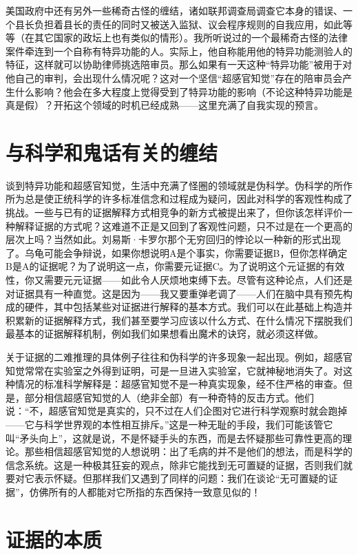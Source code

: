 美国政府中还有另外一些稀奇古怪的缠结，诸如联邦调查局调查它本身的错误、一个县长负担着县长的责任的同时又被送入监狱、议会程序规则的自我应用，如此等等（在其它国家的政坛上也有类似的情形）。我所听说过的一个最稀奇古怪的法律案件牵连到一个自称有特异功能的人。实际上，他自称能用他的特异功能测验人的特征，这样就可以协助律师挑选陪审员。那么如果有一天这种“特异功能”被用于对他自己的审判，会出现什么情况呢？这对一个坚信“超感官知觉”存在的陪审员会产生什么影响？他会在多大程度上觉得受到了特异功能的影响（不论这种特异功能是真是假）？开拓这个领域的时机已经成熟——这里充满了自我实现的预言。

\section{与科学和鬼话有关的缠结}

谈到特异功能和超感官知觉，生活中充满了怪圈的领域就是伪科学。伪科学的所作所为总是使正统科学的许多标准信念和过程成为疑问，因此对科学的客观性构成了挑战。一些与已有的证据解释方式相竞争的新方式被提出来了，但你该怎样评价一种解释证据的方式呢？这难道不正是又回到了客观性问题，只不过是在一个更高的层次上吗？当然如此。刘易斯·卡罗尔那个无穷回归的悖论以一种新的形式出现了。乌龟可能会争辩说，如果你想说明A是个事实，你需要证据B，但你怎样确定B是A的证据呢？为了说明这一点，你需要元证据C。为了说明这个元证据的有效性，你又需要元元证据——如此令人厌烦地束缚下去。尽管有这种论点，人们还是对证据具有一种直觉。这是因为——我又要重弹老调了——人们在脑中具有预先构成的硬件，其中包括某些对证据进行解释的基本方式。我们可以在此基础上构造并积累新的证据解释方式，我们甚至要学习应该以什么方式、在什么情况下摆脱我们最基本的证据解释机制，例如我们如果想看出魔术的诀窍，就必须这样做。

关于证据的二难推理的具体例子往往和伪科学的许多现象一起出现。例如，超感官知觉常常在实验室之外得到证明，可是一旦进入实验室，它就神秘地消失了。对这种情况的标准科学解释是：超感官知觉不是一种真实现象，经不住严格的审查。但是，部分相信超感官知觉的人（绝非全部）有一种奇特的反击方式。他们说：“不，超感官知觉是真实的，只不过在人们企图对它进行科学观察时就会跑掉——它与科学世界观的本性相互排斥。”这是一种无耻的手段，我们可能该管它叫“矛头向上”，这就是说，不是怀疑手头的东西，而是去怀疑那些可靠性更高的理论。那些相信超感官知觉的人想说明：出了毛病的并不是他们的想法，而是科学的信念系统。这是一种极其狂妄的观点，除非它能找到无可置疑的证据，否则我们就要对它表示怀疑。但那样我们又遇到了同样的问题：我们在谈论“无可置疑的证据”，仿佛所有的人都能对它所指的东西保持一致意见似的！

\section{证据的本质}

